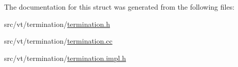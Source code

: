 The documentation for this struct was generated from the following files\+:\begin{DoxyCompactItemize}
\item 
src/vt/termination/\hyperlink{termination_8h}{termination.\+h}\item 
src/vt/termination/\hyperlink{termination_8cc}{termination.\+cc}\item 
src/vt/termination/\hyperlink{termination_8impl_8h}{termination.\+impl.\+h}\end{DoxyCompactItemize}
